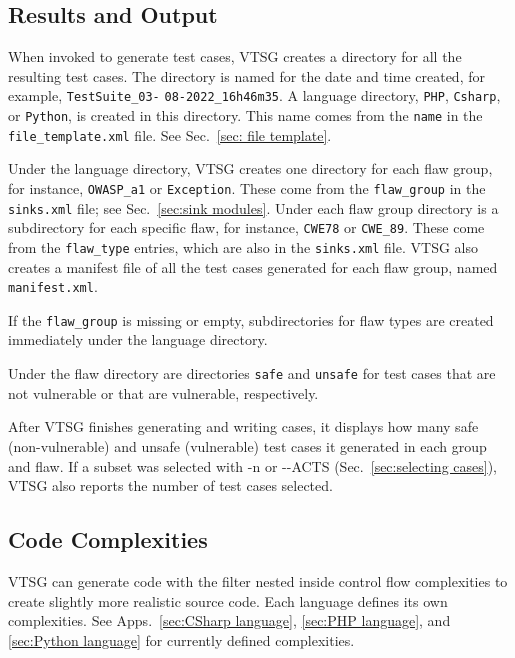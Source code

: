 \subsection{Results and Output}

\label{sec:case directory structure}
When invoked to generate test cases, VTSG creates a directory for all the resulting
test cases.
The directory is named for the date and time created, for example,
\verb|TestSuite_03-| \verb|08-2022_16h46m35|.
A language directory, \verb|PHP|,
\verb|Csharp|, or \verb|Python|, is created in this directory.
This name comes from the \verb|name|
in the \verb|file_template.xml| file.  See Sec.~\ref{sec: file template}.

Under the language directory, VTSG creates one directory for each flaw group, for
instance, \verb|OWASP_a1| or \verb|Exception|.  These come from the \verb|flaw_group|
in the \verb|sinks.xml| file; see Sec.~\ref{sec:sink modules}.
Under each flaw group directory is a subdirectory for each specific flaw, for
instance, \verb|CWE78| or \verb|CWE_89|.  These come from the \verb|flaw_type|
entries, which are also in the \verb|sinks.xml| file.
VTSG also creates a manifest file of all the test cases generated for each flaw
group, named
\verb|manifest.xml|.

If the \verb|flaw_group| is missing or empty, subdirectories for flaw types are
created immediately under the language directory.

Under the flaw directory are directories \verb|safe| and \verb|unsafe| for test
cases that are not vulnerable or that are vulnerable, respectively.

After VTSG finishes generating and writing cases, it displays how many safe
(non-vulner\-able) and unsafe (vulnerable) test cases it generated in each group and
flaw.  If a subset was selected with -n or -\zws-ACTS
(Sec.~\ref{sec:selecting cases}), VTSG also reports the number of test cases
selected.


\subsection{Code Complexities}
\label{sec:code complexities}

VTSG can generate code with the filter nested inside control flow complexities to
create slightly more realistic source code.  Each language defines its own
complexities.  See Apps.~\ref{sec:CSharp language}, \ref{sec:PHP language}, and
\ref{sec:Python language} for currently defined complexities.


